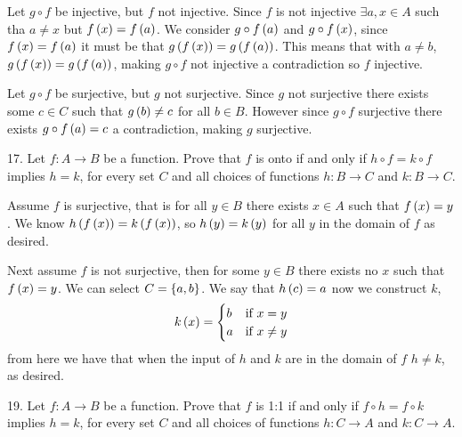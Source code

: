 \begin{mdframed}[style=darkAnswer,frametitle={Joe Starr}]
  Let $g\circ f$ be injective, but $f$ not injective. Since $f$ is not injective
  $\exists a,x\in A$ such tha $a\neq x$ but $f\left(x\right)=f\left(a\right)$. We consider
  $g\circ f\left(a\right)$ and $g\circ f\left(x\right)$, since $f\left(x\right)=f\left(a\right)$ it must be
  that $g\left(f\left(x\right)\right)=g\left(f\left(a\right)\right)$. This means that with $a\neq b$,
  $g\left(f\left(x\right)\right)=g\left(f\left(a\right)\right)$, making $g\circ f$ not injective a contradiction
  so $f$ injective.

  Let $g\circ f$ be surjective, but $g$ not surjective. Since $g$ not surjective
  there exists some $c\in C$ such that $g\left(b\right)\neq c$ for all $b\in B$. However
  since $g\circ f$ surjective there exists $g\circ f\left(a\right)=c$ a contradiction,
  making $g$ surjective.
\end{mdframed}
\newpage
\begin{mdframed}[style=darkQuesion]
  17. Let $f:A\to B$ be a function. Prove that $f$ is onto if and only if
  $h\circ f = k \circ f$ implies $h=k$, for every set $C$ and all choices of
  functions $h:B\to C$ and $k:B\to C$.
\end{mdframed}

\begin{mdframed}[style=darkAnswer,frametitle={Joe Starr}]
  Assume $f$ is surjective, that is for all $y\in B$ there exists $x\in A$ such
  that $f\left(x\right)=y$. We know $h\left(f\left(x\right)\right)=k\left(f\left(x\right)\right)$, so
  $h\left(y\right)=k\left(y\right)$ for all $y$ in the domain of $f$ as desired.

  Next assume $f$ is not surjective, then for some $y\in B$ there exists no $x$
  such that $f\left(x\right)=y$. We can select $C=\left\{a,b\right\}$. We say that $h\left(c\right)=a$
  now we construct $k$,
  $$k\left(x\right)=\begin{cases}
      b & \text{if }x=y     \\
      a & \text{if }x\neq y \\
    \end{cases}$$
  from here we have that when the input of $h$ and $k$ are in the domain of $f$
  $h\neq k$, as desired.
\end{mdframed}
\newpage
\begin{mdframed}[style=darkQuesion]
  19. Let $f:A\to B$ be a function. Prove that $f$ is 1:1 if and only if
  $f\circ h=f\circ k$ implies $h=k$, for every set $C$ and all choices of
  functions $h:C\to A$ and $k:C\to A$.
\end{mdframed}

